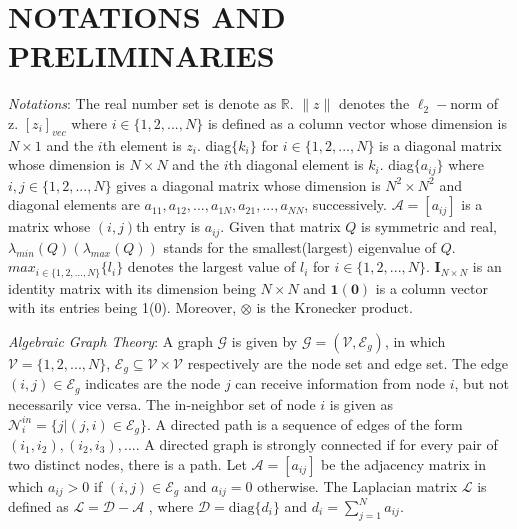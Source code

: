 \documentclass[lettersize,journal]{IEEEtran}
\begin{document}
\section{NOTATIONS AND PRELIMINARIES}
\emph{Notations}: The real number set is denote as $\mathbb{R}$. $\|z\|$ denotes the $\ell_2-$norm of z. $[z_i]_{vec}$ where $i \in \{1,2,...,N\}$ is defined as a column vector whose dimension is $N \times 1$ and the $i$th element is $z_i$. diag$\{k_i\}$ for $i \in \{1,2,...,N\}$ is a diagonal matrix whose dimension is $N\times N$ and the $i$th diagonal element is $k_i$. diag$\{a_{ij}\}$ where $i,j \in \{1,2,...,N\}$ gives a diagonal matrix whose dimension is $N^2 \times N^2$ and diagonal elements are $a_{11},a_{12},...,a_{1N},a_{21},...,a_{NN}$, successively. $\mathcal{A} = [a_{ij}]$ is a matrix whose $(i,j)$th entry is $a_{ij}$. Given that matrix $Q$ is symmetric and real, $\lambda_{min}(Q)(\lambda_{max}(Q))$ stands for the smallest(largest) eigenvalue of $Q$. $max_{i \in \{1,2,...,N\}}\{l_i\}$ denotes the largest value of $l_i$ for $i \in \{1,2,...,N\}$. $\mathbf{I}_{N \times N}$ is an identity matrix with its dimension being $N \times N$ and $\mathbf{1}(\mathbf{0})$ is a column vector with its entries being 1(0). Moreover, $\otimes$ is the Kronecker product.

\emph{Algebraic Graph Theory}: A graph $\mathcal{G}$ is given by $\mathcal{G} = (\mathcal{V},\mathcal{E}_g)$, in which $\mathcal{V} = \{1,2,...,N\}$, $\mathcal{E}_g \subseteq \mathcal{V}\times\mathcal{V}$ respectively are the node set and edge set. The edge $(i,j) \in \mathcal{E}_g$ indicates are the node $j$ can receive information from node $i$, but not necessarily vice versa. The in-neighbor set of node $i$ is given as $\mathcal{N}_{i}^{in}=\{j|(j,i)\in\mathcal{E}_{g}\}$. A directed path is a sequence of edges of the form $(i_1,i_2), (i_2,i_3),....$ A directed graph is strongly connected if for every pair of two distinct nodes, there is a path. Let $\mathcal{A} = [a_{ij}]$ be the adjacency matrix in which $a_{ij} > 0$ if $(i,j) \in \mathcal{E}_g$ and $a_{ij} = 0$ otherwise. The Laplacian matrix $\mathcal{L}$ is defined as $\mathcal{L} = \mathcal{D} - \mathcal{A}$ \cite{lewis2013cooperative}, where $\mathcal{D} = \text{diag}\{d_i\}$ and $d_i = \sum_{j=1}^{N}a_{ij}$.
\end{document}
